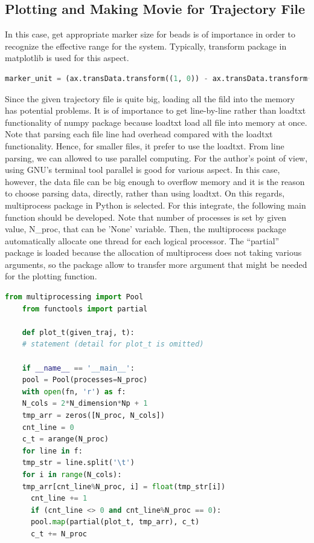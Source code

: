 \documentclass[10pt, a4paper]{article}
\begin{document}
\begin{appendices}
  
  \section{Plotting and Making Movie for Trajectory File}
  In this case, get appropriate marker size for beads is of importance in order to recognize the effective range for the system. Typically, transform package in matplotlib is used for this aspect.
  \begin{lstlisting}[language=Python,frame=single,numbers=none]
    marker_unit = (ax.transData.transform((1, 0)) - ax.transData.transform((0, 0)))[0]
  \end{lstlisting}

  Since the given trajectory file is quite big, loading all the fild into the memory has potential problems. It is of importance to get line-by-line rather than loadtxt functionality of numpy package because loadtxt load all file into memory at once. Note that parsing each file line had overhead compared with the loadtxt functionality. Hence, for smaller files, it prefer to use the loadtxt. From line parsing, we can allowed to use parallel computing. For the author's point of view, using GNU's terminal tool parallel is good for various aspect. In this case, however, the data file can be big enough to overflow memory and it is the reason to choose parsing data, directly, rather than using loadtxt. On this regards, multiprocess package in Python is selected. For this integrate, the following main function should be developed. Note that number of processes is set by given value, N{\_}proc, that can be 'None' variable. Then, the multiprocess package automatically allocate one thread for each logical processor. The ``partial'' package is loaded because the allocation of multiprocess does not taking various arguments, so the package allow to transfer more argument that might be needed for the plotting function.

  \begin{lstlisting}[language=Python,frame=single]
    from multiprocessing import Pool
    from functools import partial

    def plot_t(given_traj, t):
    # statement (detail for plot_t is omitted)

    if __name__ == '__main__':
    pool = Pool(processes=N_proc)
    with open(fn, 'r') as f:
    N_cols = 2*N_dimension*Np + 1
    tmp_arr = zeros([N_proc, N_cols])
    cnt_line = 0
    c_t = arange(N_proc)
    for line in f:
    tmp_str = line.split('\t')
    for i in range(N_cols):
    tmp_arr[cnt_line%N_proc, i] = float(tmp_str[i])
      cnt_line += 1
      if (cnt_line <> 0 and cnt_line%N_proc == 0):
      pool.map(partial(plot_t, tmp_arr), c_t)
      c_t += N_proc
  \end{lstlisting}


\end{appendices}
\end{document}
